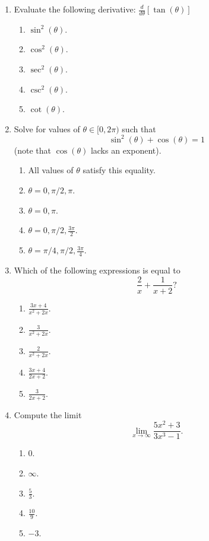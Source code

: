 \documentclass{article}
\begin{document}
\begin{enumerate}
  \item Evaluate the following derivative: $\frac{d}{d\theta}[\tan(\theta)]$
  \begin{enumerate}
    \item $\sin^2(\theta)$.
    \item $\cos^2(\theta)$.
    \item $\sec^2(\theta)$. %
    \item $\csc^2(\theta)$.
    \item $\cot(\theta)$.
  \end{enumerate}
  
  \item Solve for values of $\theta\in[0, 2\pi)$ such that \[\sin^2(\theta)+\cos(\theta)=1\]
  (note that \(\cos(\theta)\) lacks an exponent).
  \begin{enumerate}
    \item All values of $\theta$ satisfy this equality.
    \item $\theta= 0, \pi/2, \pi$.
    \item $\theta= 0, \pi$.
    \item $\theta= 0, \pi/2, \frac{3\pi}{2}$. %
    \item $\theta= \pi/4, \pi/2, \frac{3\pi}{4}$.
  \end{enumerate}
  
  \newpage
  
  \item Which of the following expressions is equal to \[\frac{2}{x}+\frac{1}{x+2}?\]
  \begin{enumerate}
    \item $\frac{3x+4}{x^2+2x}$.  %
    \item $\frac{3}{x^2+2x}$.
    \item $\frac{2}{x^2+2x}$.
    \item $\frac{3x+4}{2x+2}$.
    \item $\frac{3}{2x+2}$.
  \end{enumerate}
  
  \item Compute the limit \[\lim_{x\to\infty} \frac{5x^2+3}{3x^3-1}.\]
  \begin{enumerate}
    \item $0$.  %
    \item $\infty$.
    \item $\frac{5}{3}$.
    \item $\frac{10}{9}$.
    \item $-3$.
  \end{enumerate}
  

\end{enumerate}
\end{document}
